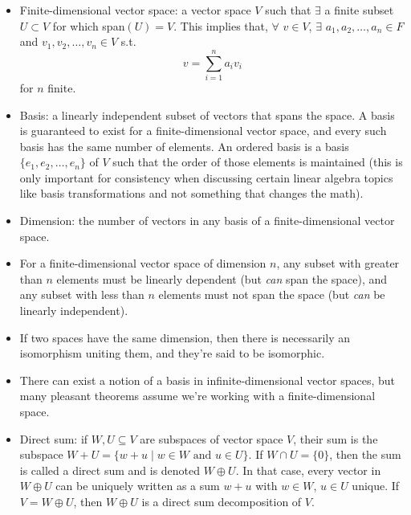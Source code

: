 \begin{itemize}
    \item Finite-dimensional vector space: a vector space $V$ such that $\exists$ a finite subset $U\subset V$ for which span$(U)= V$. This implies that, $\forall$ $v\in V$, $\exists$ $a_1, a_2, \dots, a_n\in F$ and $v_1, v_2,\dots,v_n\in V$ s.t.
    \[
        v = \sum_{i=1}^n a_i v_i
    \]
    for $n$ finite.
    \item Basis: a linearly independent subset of vectors that spans the space. A basis is guaranteed to exist for a finite-dimensional vector space, and every such basis has the same number of elements. An ordered basis is a basis $\{e_1, e_2, \dots, e_n\}$ of $V$ such that the order of those elements is maintained (this is only important for consistency when discussing certain linear algebra topics like basis transformations and not something that changes the math).
    \item Dimension: the number of vectors in any basis of a finite-dimensional vector space.
    \item For a finite-dimensional vector space of dimension $n$, any subset with greater than $n$ elements must be linearly dependent (but \textit{can} span the space), and any subset with less than $n$ elements must not span the space (but \textit{can} be linearly independent).
    \item If two spaces have the same dimension, then there is necessarily an isomorphism uniting them, and they're said to be isomorphic.
    \item There can exist a notion of a basis in infinite-dimensional vector spaces, but many pleasant theorems assume we're working with a finite-dimensional space.
    \item Direct sum: if $W, U\subseteq V$ are subspaces of vector space $V$, their sum is the subspace $W+U=\{w + u \;|\; w\in W\text{ and } u\in U\}.$ If $W\cap U=\{0\}$, then the sum is called a direct sum and is denoted $W\oplus U$. In that case, every vector in $W\oplus U$ can be uniquely written as a sum $w + u$ with $w \in W$, $u\in U$ unique. If $V=W\oplus U$, then $W\oplus U$ is a direct sum decomposition of $V$.
\end{itemize}

